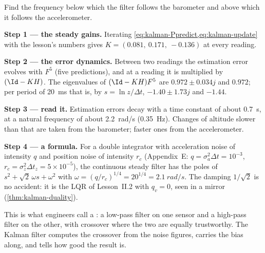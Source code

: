 \begin{example}
\label{ex:kalman-bandwidth}
Find the frequency below which the filter follows the barometer and above which it follows the accelerometer.

\textbf{Step 1 — the steady gains.} Iterating \cref{eq:kalman-Ppredict,eq:kalman-update} with the lesson's numbers gives $K = (0.081,\ 0.171,\ -0.136)$ at every reading.

\textbf{Step 2 — the error dynamics.} Between two readings the estimation error evolves with $F^5$ (five predictions), and at a reading it is multiplied by $(\Id - KH)$. The eigenvalues of $(\Id - KH)F^5$ are $0.972 \pm 0.034j$ and $0.972$; per period of \SI{20}{ms} that is, by $s = \ln z/\Delta t$, $-1.40 \pm 1.73j$ and $-1.44$.

\textbf{Step 3 — read it.} Estimation errors decay with a time constant of about \SI{0.7}{s}, at a natural frequency of about \SI{2.2}{rad/s} (\SI{0.35}{Hz}). Changes of altitude slower than that are taken from the barometer; faster ones from the accelerometer.

\textbf{Step 4 — a formula.} For a double integrator with acceleration noise of intensity $q$ and position noise of intensity $r_c$ (Appendix~E: $q = \sigma_a^2\Delta t = 10^{-3}$, $r_c = \sigma_z^2\Delta t_z = 5 \times 10^{-5}$), the continuous steady filter has the poles of $s^2 + \sqrt2\,\omega s + \omega^2$ with $\omega = (q/r_c)^{1/4} = 20^{1/4} = \SI{2.1}{rad/s}$. The damping $1/\sqrt2$ is no accident: it is the LQR of Lesson~II.2 with $q_v = 0$, seen in a mirror (\cref{thm:kalman-duality}).
\end{example}

This is what engineers call a : a low-pass filter on one sensor and a high-pass filter on the other, with crossover where the two are equally trustworthy. The Kalman filter computes the crossover from the noise figures, carries the bias along, and tells how good the result is.


